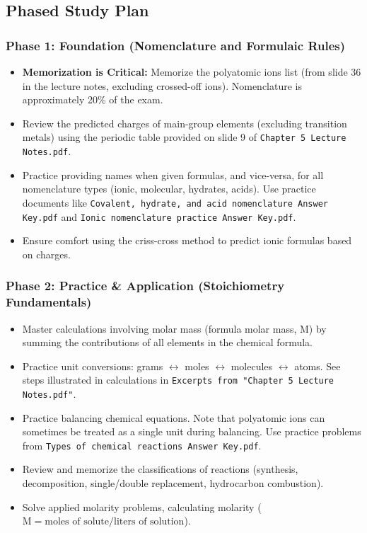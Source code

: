\documentclass{article}
\begin{document}
\bigskip %

\subsection*{Phased Study Plan}

\subsubsection*{Phase 1: Foundation (Nomenclature and Formulaic Rules)}
\begin{itemize}
    \item \textbf{Memorization is Critical:} Memorize the polyatomic ions list (from slide 36 in the lecture notes, excluding crossed-off ions). Nomenclature is approximately 20\% of the exam.
    \item Review the predicted charges of main-group elements (excluding transition metals) using the periodic table provided on slide 9 of \texttt{Chapter 5 Lecture Notes.pdf}.
    \item Practice providing names when given formulas, and vice-versa, for all nomenclature types (ionic, molecular, hydrates, acids). Use practice documents like \texttt{Covalent, hydrate, and acid nomenclature Answer Key.pdf} and \texttt{Ionic nomenclature practice Answer Key.pdf}.
    \item Ensure comfort using the criss-cross method to predict ionic formulas based on charges.
\end{itemize}

\bigskip %

\subsubsection*{Phase 2: Practice \& Application (Stoichiometry Fundamentals)}
\begin{itemize}
    \item Master calculations involving molar mass (formula molar mass, $\text{M}$) by summing the contributions of all elements in the chemical formula.
    \item Practice unit conversions: grams $\leftrightarrow$ moles $\leftrightarrow$ molecules $\leftrightarrow$ atoms. See steps illustrated in calculations in \texttt{Excerpts from "Chapter 5 Lecture Notes.pdf"}.
    \item Practice balancing chemical equations. Note that polyatomic ions can sometimes be treated as a single unit during balancing. Use practice problems from \texttt{Types of chemical reactions Answer Key.pdf}.
    \item Review and memorize the classifications of reactions (synthesis, decomposition, single/double replacement, hydrocarbon combustion).
    \item Solve applied molarity problems, calculating molarity ($\text{M} = \text{moles of solute} / \text{liters of solution}$).
\end{itemize}
\end{document}
